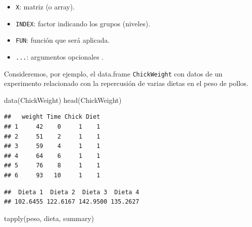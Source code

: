 \documentclass[
]{book}
\newenvironment{Shaded}{\begin{snugshade}}{\end{snugshade}}
\newcommand{\CommentTok}[1]{\textcolor[rgb]{0.56,0.35,0.01}{\textit{#1}}}
\newcommand{\FunctionTok}[1]{\textcolor[rgb]{0.00,0.00,0.00}{#1}}
\newcommand{\NormalTok}[1]{#1}
\newcommand{\OtherTok}[1]{\textcolor[rgb]{0.56,0.35,0.01}{#1}}
\newcommand{\SpecialCharTok}[1]{\textcolor[rgb]{0.00,0.00,0.00}{#1}}
\newcommand{\StringTok}[1]{\textcolor[rgb]{0.31,0.60,0.02}{#1}}
\providecommand{\tightlist}{%
  \setlength{\itemsep}{0pt}\setlength{\parskip}{0pt}}
\theoremstyle{break}
\theoremstyle{nonumberplain}
\begin{document}
\begin{itemize}
\tightlist
\item
  \texttt{X}: matriz (o array).
\item
  \texttt{INDEX}: factor indicando los grupos (niveles).
\item
  \texttt{FUN}: función que será aplicada.
\item
  \texttt{...}: argumentos opcionales .
\end{itemize}

Consideremos, por ejemplo, el data.frame \texttt{ChickWeight} con datos de un
experimento relacionado con la repercusión de varias dietas en el peso
de pollos.

\begin{Shaded}
\begin{Highlighting}[]
\FunctionTok{data}\NormalTok{(ChickWeight)}
\FunctionTok{head}\NormalTok{(ChickWeight)}
\end{Highlighting}
\end{Shaded}

\begin{verbatim}
##   weight Time Chick Diet
## 1     42    0     1    1
## 2     51    2     1    1
## 3     59    4     1    1
## 4     64    6     1    1
## 5     76    8     1    1
## 6     93   10     1    1
\end{verbatim}

\begin{Shaded}
\end{Shaded}

\begin{verbatim}
##  Dieta 1  Dieta 2  Dieta 3  Dieta 4 
## 102.6455 122.6167 142.9500 135.2627
\end{verbatim}

\begin{Shaded}
\begin{Highlighting}[]
\FunctionTok{tapply}\NormalTok{(peso, dieta, summary)}
\end{Highlighting}
\end{Shaded}
\end{document}
